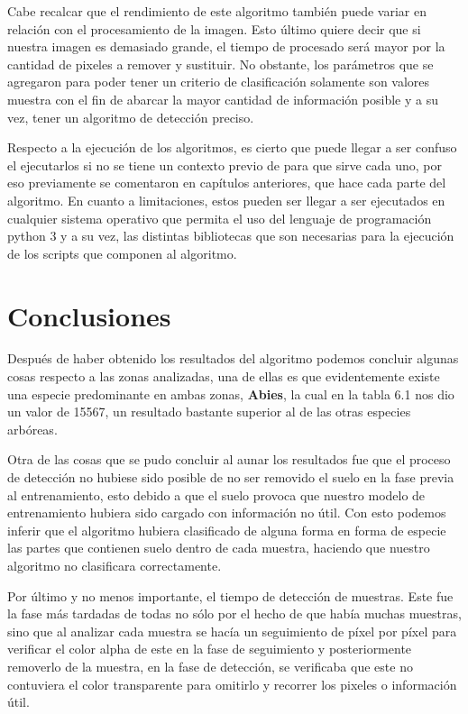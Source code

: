 Cabe recalcar que el rendimiento de este algoritmo también puede variar en relación con el procesamiento de la imagen. Esto último quiere decir que si nuestra imagen es demasiado grande, el tiempo de procesado será mayor por la cantidad de pixeles a remover y sustituir. 
No obstante, los parámetros que se agregaron para poder tener un criterio de clasificación solamente son valores muestra con el fin de abarcar la mayor cantidad de información posible y a su vez, tener un algoritmo de detección preciso.

Respecto a la ejecución de los algoritmos, es cierto que puede llegar a ser confuso el ejecutarlos si no se tiene un contexto previo de para que sirve cada uno, por eso previamente se comentaron en capítulos anteriores, que hace cada parte del algoritmo. En cuanto a limitaciones, estos pueden ser llegar a ser ejecutados en cualquier sistema operativo que permita el uso del lenguaje de programación python 3 y a su vez, las distintas bibliotecas que son necesarias para la ejecución de los scripts que componen al algoritmo.


\chapter{Conclusiones}
Después de haber obtenido los resultados del algoritmo podemos concluir algunas cosas respecto a las zonas analizadas, una de ellas es que evidentemente existe una especie predominante en ambas zonas, \textbf{Abies}, la cual en la tabla 6.1 nos dio un valor de 15567, un resultado bastante superior al de las otras especies arbóreas.

Otra de las cosas que se pudo concluir al aunar los resultados fue que el proceso de detección no hubiese sido posible de no ser removido el suelo en la fase previa al entrenamiento, esto debido a que el suelo provoca que nuestro modelo de entrenamiento hubiera sido cargado con información no útil. Con esto podemos inferir que el algoritmo hubiera clasificado de alguna forma en forma de especie las partes que contienen suelo dentro de cada muestra, haciendo que nuestro algoritmo no clasificara correctamente.

Por último y no menos importante, el tiempo de detección de muestras. Este fue la fase más tardadas de todas no sólo por el hecho de que había muchas muestras, sino que al analizar cada muestra se hacía un seguimiento de píxel por píxel para verificar el color alpha de este en la fase de seguimiento y posteriormente removerlo de la muestra, en la fase de detección, se verificaba que este no contuviera el color transparente para omitirlo y recorrer los pixeles o información útil.
